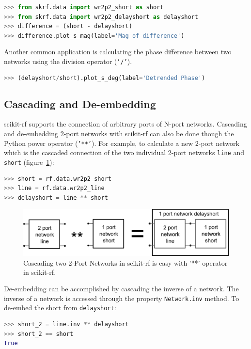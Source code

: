 \documentclass{IEEEjmw}
\begin{document}
\begin{lstlisting}[language=Python]
>>> from skrf.data import wr2p2_short as short
>>> from skrf.data import wr2p2_delayshort as delayshort
>>> difference = (short - delayshort)
>>> difference.plot_s_mag(label='Mag of difference')
\end{lstlisting}

Another common application is calculating the phase difference between two networks using the division operator (\texttt{'/'}). 

\begin{lstlisting}[language=Python]
>>> (delayshort/short).plot_s_deg(label='Detrended Phase')
\end{lstlisting}

\subsection{Cascading and De-embedding}
scikit-rf supports the connection of arbitrary ports of N-port networks. Cascading and de-embedding 2-port networks with scikit-rf can also be done though the Python power operator (\texttt{'**'}). For example, to calculate a new 2-port network which is the cascaded connection of the two individual 2-port networks \texttt{line} and \texttt{short} (figure~\ref{fig:cascading}):

\begin{lstlisting}[language=Python]
>>> short = rf.data.wr2p2_short
>>> line = rf.data.wr2p2_line
>>> delayshort = line ** short
\end{lstlisting}

\begin{figure}
	\centering
	\includegraphics[width=0.95\linewidth]{figures/cascading}
	\caption{Cascading two 2-Port Networks in scikit-rf is easy with '**' operator in scikit-rf.}
	\label{fig:cascading}
\end{figure}

De-embedding can be accomplished by cascading the inverse of a network. The inverse of a network is accessed through the property \texttt{Network.inv} method. To de-embed the short from \texttt{delayshort}:

\begin{lstlisting}[language=Python]
>>> short_2 = line.inv ** delayshort
>>> short_2 == short
True
\end{lstlisting}
\end{document}
